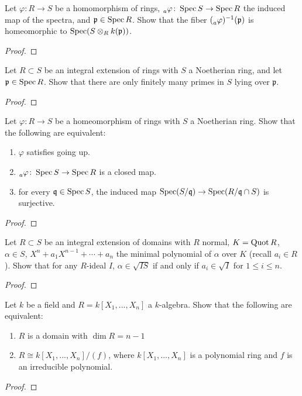 \begin{problem}
Let $\varphi\colon R\to S$ be a homomorphism of rings,
$\prescript{}{a}{\varphi}\colon \operatorname{Spec} S\to\operatorname{Spec} R$ the induced map of the
spectra, and $\mathfrak{p}\in\operatorname{Spec} R$. Show that the fiber
$(\prescript{}{a}{\varphi})^{-1}(\mathfrak{p})$ is homeomorphic to
$\operatorname{Spec}(S\otimes_R k(\mathfrak{p}))$.
\end{problem}
\begin{proof}
\end{proof}
\newpage
\begin{problem}
Let $R\subset S$ be an integral extension of rings with $S$ a Noetherian
ring, and let $\mathfrak{p}\in\operatorname{Spec} R$. Show that there are only finitely
many primes in $S$ lying over $\mathfrak{p}$.
\end{problem}
\begin{proof}
\end{proof}
\newpage
\begin{problem}
Let $\varphi\colon R\to S$ be a homeomorphism of rings with $S$ a
Noetherian ring. Show that the following are equivalent:
\begin{enumerate}[label=(\roman*)]
\item $\varphi$ satisfies going up.
\item $\prescript{}{a}\varphi\colon\operatorname{Spec} S\to\operatorname{Spec} R$ is a closed map.
\item for every $\mathfrak{q}\in\operatorname{Spec} S$, the induced map
  $\operatorname{Spec}(S/\mathfrak{q})\to\operatorname{Spec}(R/\mathfrak{q}\cap S)$ is surjective.
\end{enumerate}
\end{problem}
\begin{proof}
\end{proof}
\newpage
\begin{problem}
Let $R\subset S$ be an integral extension of domains with $R$ normal,
$K=\operatorname{Quot} R$,  $\alpha\in S$, $X^n+a_1X^{n-1}+\cdots+a_n$ the minimal
polynomial of $\alpha$ over $K$ (recall $a_i\in R$). Show that for any
$R$-ideal $I$, $\alpha\in \sqrt{IS}$ if and only if $a_i\in\sqrt{I}$ for
$1\leq i\leq n$.
\end{problem}
\begin{proof}
\end{proof}
\newpage
\begin{problem}
Let $k$ be a field and $R=k[X_1,...,X_n]$ a $k$-algebra. Show that the
following are equivalent:
\begin{enumerate}[label=(\roman*)]
\item $R$ is a domain with $\dim R=n-1$
\item $R\cong k[X_1,...,X_n]/(f)$, where $k[X_1,...,X_n]$ is a polynomial
  ring and $f$ is an irreducible polynomial.
\end{enumerate}
\end{problem}
\begin{proof}
\end{proof}


